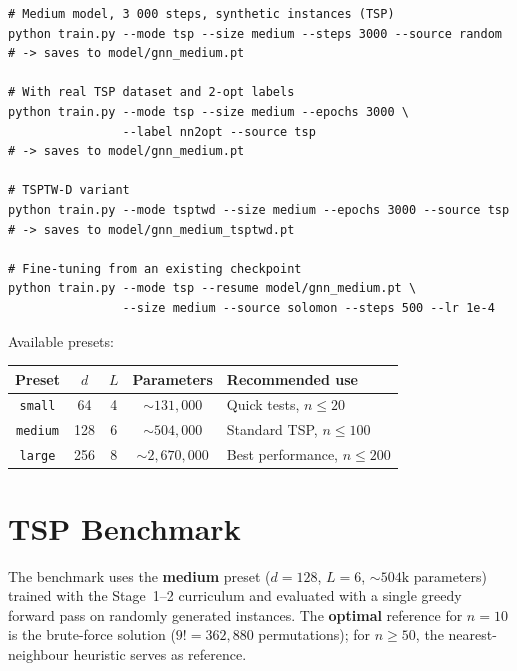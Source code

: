 \documentclass[12pt,a4paper]{article}
\begin{document}
\begin{lstlisting}[style=bashstyle,
  caption={Training from the command line
           (run from \texttt{DL\_MODEL/gnn/})}]
# Medium model, 3 000 steps, synthetic instances (TSP)
python train.py --mode tsp --size medium --steps 3000 --source random
# -> saves to model/gnn_medium.pt

# With real TSP dataset and 2-opt labels
python train.py --mode tsp --size medium --epochs 3000 \
                --label nn2opt --source tsp
# -> saves to model/gnn_medium.pt

# TSPTW-D variant
python train.py --mode tsptwd --size medium --epochs 3000 --source tsp
# -> saves to model/gnn_medium_tsptwd.pt

# Fine-tuning from an existing checkpoint
python train.py --mode tsp --resume model/gnn_medium.pt \
                --size medium --source solomon --steps 500 --lr 1e-4
\end{lstlisting}

Available presets:

\begin{center}
\begin{tabularx}{\linewidth}{ccccX}
\toprule
\textbf{Preset} & $d$ & $L$ & \textbf{Parameters} & \textbf{Recommended use} \\
\midrule
\texttt{small}  & 64  & 4 & $\sim 131{,}000$   & Quick tests, $n \leq 20$ \\
\texttt{medium} & 128 & 6 & $\sim 504{,}000$   & Standard TSP, $n \leq 100$ \\
\texttt{large}  & 256 & 8 & $\sim 2{,}670{,}000$ & Best performance, $n \leq 200$ \\
\bottomrule
\end{tabularx}
\end{center}

\section{TSP Benchmark}

The benchmark uses the \textbf{medium} preset ($d=128$, $L=6$,
${\sim}504\mathrm{k}$ parameters) trained with the Stage~1--2 curriculum
and evaluated with a single greedy forward pass on randomly generated instances.
The \textbf{optimal} reference for $n=10$ is the brute-force solution
($9! = 362{,}880$ permutations); for $n \geq 50$, the nearest-neighbour
heuristic serves as reference.
\end{document}
